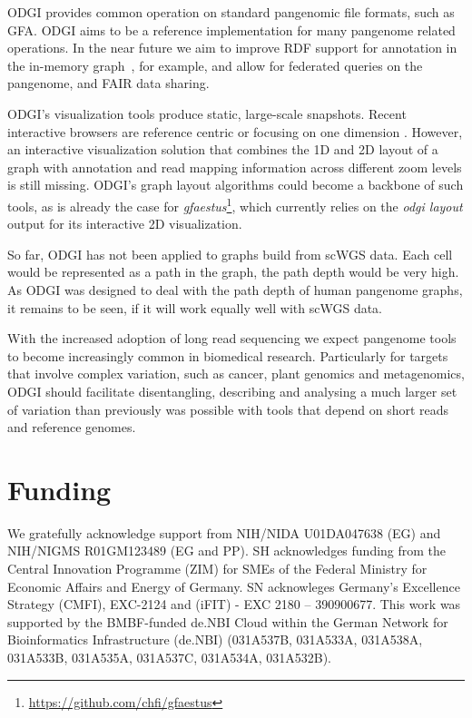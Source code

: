 \documentclass{bioinfo}
\begin{document}
ODGI provides common operation on standard pangenomic file formats, such as GFA. ODGI aims to be a reference implementation for many pangenome related operations. In the near future we aim to improve RDF support for annotation in the in-memory graph~\citep{Yokoyama2020}, for example, and allow for federated queries on the pangenome, and FAIR data sharing.

ODGI's visualization tools produce static, large-scale snapshots. Recent interactive browsers are reference centric \citep{Beyer2019, Yokoyama2019, Durant2021, Liang2021} or focusing on one dimension \citep{Wick_2015}. However, an interactive visualization solution that combines the 1D and 2D layout of a graph with annotation and read mapping information across different zoom levels is still missing. ODGI's graph layout algorithms could become a backbone of such tools, as is already the case for \textit{gfaestus}\footnote{\url{https://github.com/chfi/gfaestus}}, which currently relies on the \textit{odgi layout} output for its interactive 2D visualization.

So far, ODGI has not been applied to graphs build from scWGS \citep{Zhuo2021} data. Each cell would be represented as a path in the graph, the path depth would be very high. As ODGI was designed to deal with the path depth of human pangenome graphs, it remains to be seen, if it will work equally well with scWGS data.

With the increased adoption of long read sequencing we expect pangenome tools to become increasingly common in biomedical research. Particularly for targets that involve complex variation, such as cancer, plant genomics and metagenomics, ODGI should facilitate disentangling, describing and analysing a much larger set of variation than previously was possible with tools that depend on short reads and reference genomes.

\section*{Funding}

We gratefully acknowledge support from NIH/NIDA U01DA047638 (EG) and NIH/NIGMS R01GM123489 (EG and PP).
SH acknowledges funding from the Central Innovation Programme (ZIM) for SMEs of the Federal Ministry for Economic Affairs and Energy of Germany. SN acknowleges Germany’s Excellence Strategy (CMFI), EXC-2124 and (iFIT) - EXC 2180 – 390900677.
This work was supported by the BMBF-funded de.NBI Cloud within the German Network for Bioinformatics Infrastructure (de.NBI) (031A537B, 031A533A, 031A538A, 031A533B, 031A535A, 031A537C, 031A534A, 031A532B).
\end{document}
